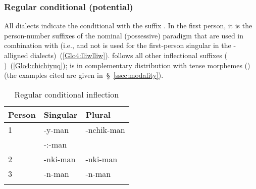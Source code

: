 \subsubsection{Regular conditional (potential) }\label{ssec:regcond}
All \SYQ{} dialects indicate the conditional with the suffix . In the first person, it is the person-number suffixes of the nominal (possessive) paradigm that are used in combination with  (i.e.,  and not  is used for the first-person singular in the \QII{}-alligned dialects)~(\ref{Glo4:lliwlliw}).  follows all other inflectional suffixes ( )~(\ref{Glo4:chichiyuq});  is in complementary distribution with tense morphemes () (the examples cited are given in~§~\ref{ssec:modality}).

\begin{table}[!ht]
\small\centering
\caption{Regular conditional inflection}\label{Tab21a}
\begin{tabular}{lll}
\lsptoprule
Person		& Singular		& Plural	\\
\midrule
1	& -y-man\tss{\AMV,\LT}		& -nchik-man		\\
	& -:-man\tss{\ACH,\CH,\SP}	& 		\\[2ex]
2	& -nki-man		& -nki-man		\\[2ex]
3	& -n-man		& -n-man		\\
\lspbottomrule
\end{tabular}
\end{table}

\begin{table}[!ht]
\small\centering
\caption{Regular conditional inflection -- actor-object suffixes}\label{Tab21b}
\end{table}

